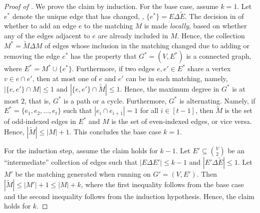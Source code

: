 \documentclass{toc}
\begin{document}

\begin{proof}[Proof of ]
	We prove the claim by induction. 
	For the base case, assume $k=1$. Let $e^*$ denote the unique edge that has changed, \ie, $\{e^*\} = E \Delta \widetilde{E}$. 
	The decision in  of whether to add an edge $e$ to the matching $M$ is made \emph{locally}, based on whether any of the edges adjacent to $e$ are already included in $M$. Hence, the collection $M^* = \widetilde{M} \Delta M$ of edges whose inclusion in the matching changed due to adding or removing the edge $e^*$ has the property that $G^* = (V, E^*)$ is a connected graph, where $E^* = M^* \cup \{e^*\}$. Furthermore, if two edges $e,e' \in E^*$ share a vertex $v \in e \cap e'$, then at most one of $e$ and $e'$ can be in each matching, namely, $|\{e,e'\} \cap M| \leq 1$ and $|\{e,e'\} \cap \widetilde{M}| \leq 1$. Hence, the maximum degree in $G^*$ is at most $2$, that is, $G^*$ is a path or a cycle. Furthermore, $G^*$ is alternating. Namely, if $E^* = \{e_1,e_2,...,e_t\}$ such that $|e_i \cap e_{i+1}| = 1$ for all $i \in [t-1]$, then $\widetilde{M}$ is the set of odd-indexed edges in $E^*$ and $M$ is the set of even-indexed edges, or vice versa. Hence, $|\widetilde{M}| \leq |M| + 1$. This concludes the base case $k=1$.

	For the induction step, assume the claim holds for $k-1$. Let $E' \subseteq \binom{V}{2}$ be an ``intermediate'' collection of edges such that $|E \Delta E'| \leq k-1$ and $|E' \Delta \widetilde{E}| \leq 1$. Let $M'$ be the matching generated when running  on $G' = (V,E')$. Then $|\widetilde{M}| \leq |M'| + 1 \leq |M| + k$, where the first inequality follows from the base case and the second inequality follows from the induction hypothesis. Hence, the claim holds for $k$.
\end{proof}
\end{document}
